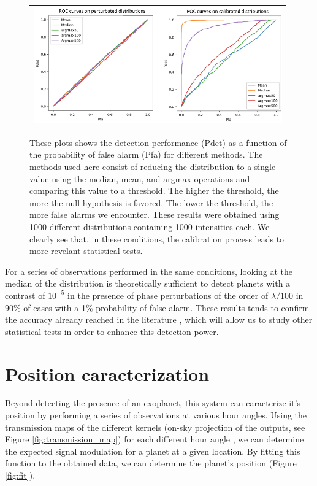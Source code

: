 \documentclass[]{spie}  %
\begin{document}
\begin{figure} [H]
    \begin{center}
    \begin{tabular}{c}
    \includegraphics[height=5cm]{img/ROC.png}
    \end{tabular}
    \end{center}
    \caption[ROC] 
    { \label{fig:ROC} 
    These plots shows the detection performance (Pdet) as a function of the probability of false alarm (Pfa) for different methods. The methods used here consist of reducing the distribution to a single value using the median, mean, and argmax operations and comparing this value to a threshold. The higher the threshold, the more the null hypothesis is favored. The lower the threshold, the more false alarms we encounter. These results were obtained using 1000 different distributions containing 1000 intensities each. We clearly see that, in these conditions, the calibration process leads to more revelant statistical tests.}
\end{figure}

For a series of observations performed in the same conditions, looking at the median of the distribution is theoretically sufficient to detect planets with a contrast of $10^{-5}$ in the presence of phase perturbations of the order of $\lambda / 100$ in 90\% of cases with a 1\% probability of false alarm. These results tends to confirm the accuracy already reached in the literature \cite{Cvetojevic et al. 2022}, which will allow us to study other statistical tests in order to enhance this detection power.

\section{Position caracterization}

Beyond detecting the presence of an exoplanet, this system can caracterize it's position by performing a series of observations at various hour angles. Using the transmission maps of the different kernels (on-sky projection of the outputs, see Figure \ref{fig:transmission_map}) for each different hour angle \cite{Chingaipe}, we can determine the expected signal modulation for a planet at a given location. By fitting this function to the obtained data, we can determine the planet's position (Figure \ref{fig:fit}).
\end{document}
